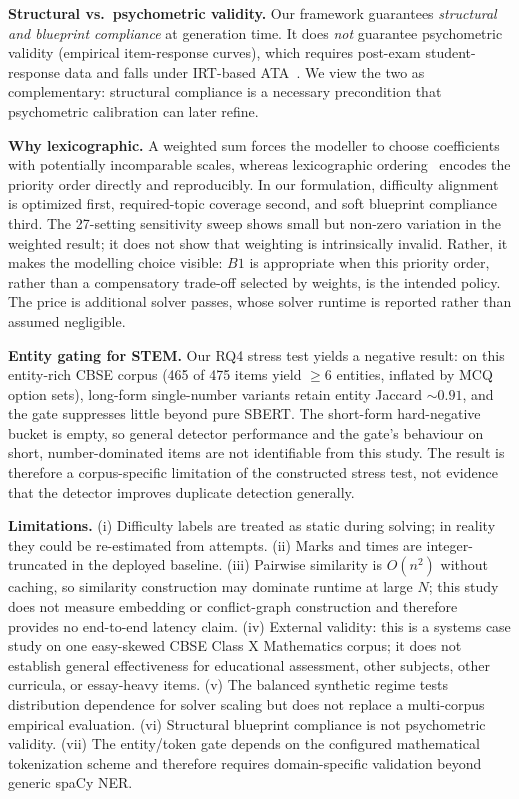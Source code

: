 \documentclass[runningheads]{llncs}
\begin{document}
\noindent\textbf{Structural vs.\ psychometric validity.} Our framework guarantees \emph{structural and blueprint compliance} at generation time.
It does \emph{not} guarantee psychometric validity (empirical item-response curves), which requires post-exam student-response data and falls under IRT-based ATA~\cite{lord1980,vanderLinden2005}.
We view the two as complementary: structural compliance is a necessary precondition that psychometric calibration can later refine.

\noindent\textbf{Why lexicographic.} A weighted sum forces the modeller to choose coefficients with potentially incomparable scales, whereas lexicographic ordering~\cite{ehrgott2005} encodes the priority order directly and reproducibly.
In our formulation, difficulty alignment is optimized first, required-topic coverage second, and soft blueprint compliance third.
The 27-setting sensitivity sweep shows small but non-zero variation in the weighted result;
it does not show that weighting is intrinsically invalid. Rather, it makes the modelling choice visible: $B1$ is appropriate when this priority order, rather than a compensatory trade-off selected by weights, is the intended policy.
The price is additional solver passes, whose solver runtime is reported rather than assumed negligible.

\noindent\textbf{Entity gating for STEM.} Our RQ4 stress test yields a negative result: on this entity-rich CBSE corpus (465 of 475 items yield $\ge6$ entities, inflated by MCQ option sets), long-form single-number variants retain entity Jaccard ${\sim}0.91$, and the gate suppresses little beyond pure SBERT.
The short-form hard-negative bucket is empty, so general detector performance and the gate's behaviour on short, number-dominated items are not identifiable from this study.
The result is therefore a corpus-specific limitation of the constructed stress test, not evidence that the detector improves duplicate detection generally.

\noindent\textbf{Limitations.} (i) Difficulty labels are treated as static during solving; in reality they could be re-estimated from attempts.
(ii) Marks and times are integer-truncated in the deployed baseline.
(iii) Pairwise similarity is $O(n^2)$ without caching, so similarity construction may dominate runtime at large $N$;
this study does not measure embedding or conflict-graph construction and therefore provides no end-to-end latency claim.
(iv) External validity: this is a systems case study on one easy-skewed CBSE Class X Mathematics corpus;
it does not establish general effectiveness for educational assessment, other subjects, other curricula, or essay-heavy items.
(v) The balanced synthetic regime tests distribution dependence for solver scaling but does not replace a multi-corpus empirical evaluation.
(vi) Structural blueprint compliance is not psychometric validity. (vii) The entity/token gate depends on the configured mathematical tokenization scheme and therefore requires domain-specific validation beyond generic spaCy NER.
\end{document}
